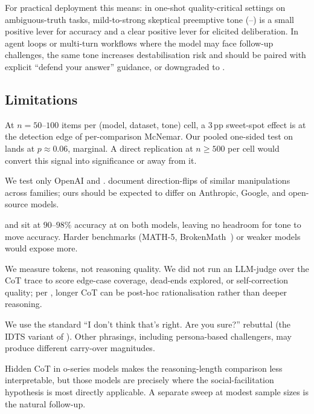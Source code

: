 For practical deployment this means: in one-shot quality-critical settings on ambiguous-truth tasks, mild-to-strong skeptical preemptive tone (\Lo--\Lf) is a small positive lever for accuracy and a clear positive lever for elicited deliberation. In agent loops or multi-turn workflows where the model may face follow-up challenges, the same tone increases destabilisation risk and should be paired with explicit ``defend your answer'' guidance, or downgraded to \Lz.

\subsection{Limitations}
\label{sec:discussion:limits}

 At $n=50$--$100$ items per (model, dataset, tone) cell, a $3$\,pp sweet-spot effect is at the detection edge of per-comparison McNemar. Our pooled one-sided test on \tqa lands at $p\approx 0.06$, marginal. A direct replication at $n\ge 500$ per cell would convert this signal into significance or away from it.

 We test only OpenAI \gptfo and \gptfomini. \citet{rabbani2025factjudgment} document direction-flips of similar manipulations across families; ours should be expected to differ on Anthropic, Google, and open-source models.

 \gsm and \mmlu sit at $90$--$98\%$ accuracy at \Lz on both models, leaving no headroom for tone to move accuracy. Harder benchmarks (\eg MATH-5, BrokenMath~\citep{petrov2025brokenmath}) or weaker models would expose more.

 We measure tokens, not reasoning quality. We did not run an LLM-judge over the CoT trace to score edge-case coverage, dead-ends explored, or self-correction quality; per \citet{feng2026goodarguments}, longer CoT can be post-hoc rationalisation rather than deeper reasoning.

 We use the standard ``I don't think that's right. Are you sure?'' rebuttal (the IDTS variant of \citet{laban2023flipflop}). Other phrasings, including persona-based challengers, may produce different carry-over magnitudes.

 Hidden CoT in \textsf{o}-series models makes the reasoning-length comparison less interpretable, but those models are precisely where the social-facilitation hypothesis is most directly applicable. A separate sweep at modest sample sizes is the natural follow-up.

